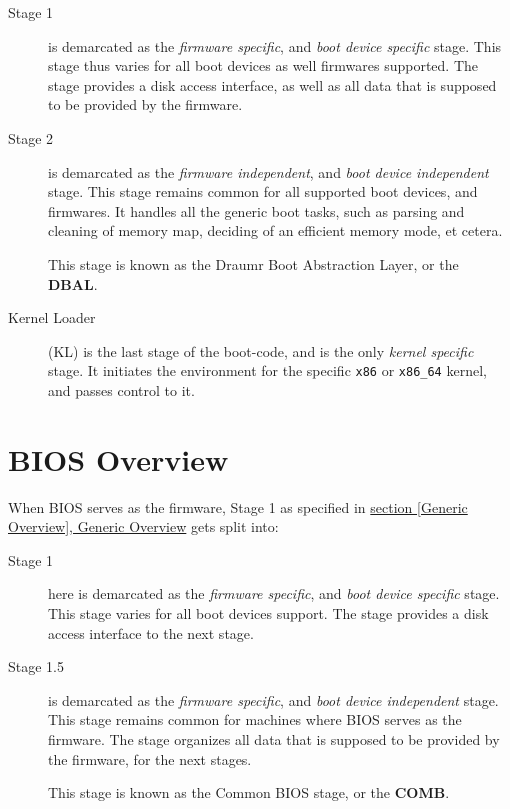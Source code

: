 \documentclass[a4paper,oneside]{memoir}
\begin{document}
\begin{description}
    \item[Stage 1] is demarcated as the \emph{firmware specific}, and \emph{boot device specific} stage. This stage thus varies for all boot devices as well firmwares supported. The stage provides a disk access interface, as well as all data that is supposed to be provided by the firmware.

    \item[Stage 2] is demarcated as the \emph{firmware independent}, and \emph{boot device independent} stage. This stage remains common for all supported boot devices, and firmwares. It handles all the generic boot tasks, such as parsing and cleaning of memory map, deciding of an efficient memory mode, et cetera. 

    This stage is known as the Draumr Boot Abstraction Layer, or the \textbf{DBAL}.

    \item[Kernel Loader]  (KL) is the last stage of the boot-code, and is the only \emph{kernel specific} stage. It initiates the environment for the specific \texttt{x86} or \texttt{x86\_64} kernel, and passes control to it.
\end{description}

\section{BIOS Overview}

When BIOS serves as the firmware, Stage 1 as specified in \hyperref[Generic Overview]{section \ref*{Generic Overview}, Generic Overview} gets split into:

\begin{description}
    \item[Stage 1] here is demarcated as the \emph{firmware specific}, and \emph{boot device specific} stage. This stage varies for all boot devices support. The stage provides a disk access interface to the next stage.

    \item[Stage 1.5]  is demarcated as the \emph{firmware specific}, and \emph{boot device independent} stage. This stage remains common for machines where BIOS serves as the firmware. The stage organizes all data that is supposed to be provided by the firmware, for the next stages.

    This stage is known as the Common BIOS stage, or the \textbf{COMB}.
\end{description}
\end{document}
